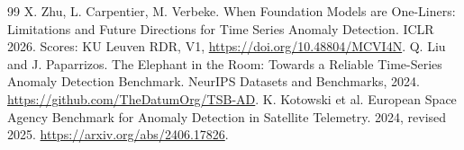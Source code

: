 \documentclass[10pt]{article}
\begin{document}
\begin{thebibliography}{99}
 X. Zhu, L. Carpentier, M. Verbeke. When Foundation Models are One-Liners: Limitations and Future Directions for Time Series Anomaly Detection. ICLR 2026. Scores: KU Leuven RDR, V1, \url{https://doi.org/10.48804/MCVI4N}.
 Q. Liu and J. Paparrizos. The Elephant in the Room: Towards a Reliable Time-Series Anomaly Detection Benchmark. NeurIPS Datasets and Benchmarks, 2024. \url{https://github.com/TheDatumOrg/TSB-AD}.
 K. Kotowski et al. European Space Agency Benchmark for Anomaly Detection in Satellite Telemetry. 2024, revised 2025. \url{https://arxiv.org/abs/2406.17826}.
\end{thebibliography}
\end{document}
